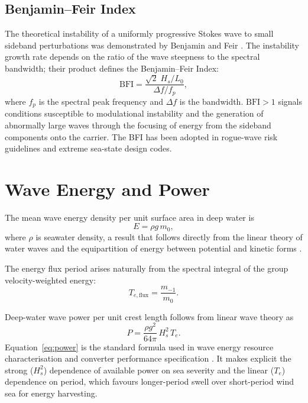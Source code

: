 \documentclass[journal]{IEEEtran}
\begin{document}
    \subsection{Benjamin--Feir Index}

    The theoretical instability of a uniformly progressive Stokes wave to
    small sideband perturbations was demonstrated by Benjamin and Feir
    \cite{BenjaminFeir1967}.
    The instability growth rate depends on the ratio of the wave steepness
    to the spectral bandwidth; their product defines the
    Benjamin--Feir Index:
    \begin{equation}
        \mathrm{BFI} = \frac{\sqrt{2}\;H_s/L_0}{\Delta f / f_p},
    \end{equation}
    where $f_p$ is the spectral peak frequency and $\Delta f$ is the
    bandwidth.
    $\mathrm{BFI} > 1$ signals conditions susceptible to modulational
    instability and the generation of abnormally large waves through
    the focusing of energy from the sideband components onto the carrier.
    The BFI has been adopted in rogue-wave risk guidelines and extreme
    sea-state design codes.

    \section{Wave Energy and Power}
    \label{sec:energy}

    The mean wave energy density per unit surface area in deep water is
    \begin{equation}
        E = \rho g\,m_0,
    \end{equation}
    where $\rho$ is seawater density, a result that follows directly
    from the linear theory of water waves and the equipartition of energy
    between potential and kinetic forms \cite{Whitham1974}.

    The energy flux period arises naturally from the spectral integral
    of the group velocity-weighted energy:
    \begin{equation}
        T_{e,\mathrm{flux}} = \frac{m_{-1}}{m_0}.
    \end{equation}

    Deep-water wave power per unit crest length follows from linear wave
    theory as
    \begin{equation}
        P = \frac{\rho g^2}{64\pi}\,H_s^2\,T_e.
        \label{eq:power}
    \end{equation}
    Equation~\eqref{eq:power} is the standard formula used in wave energy
    resource characterisation and converter performance specification
    \cite{EMEC2009}.
    It makes explicit the strong ($H_s^2$) dependence of available power
    on sea severity and the linear ($T_e$) dependence on period, which
    favours longer-period swell over short-period wind sea for energy
    harvesting.
\end{document}
